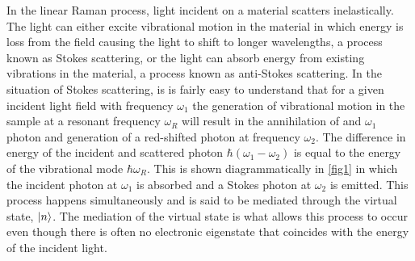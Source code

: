 In the linear Raman process, light incident on a material scatters inelastically. The light can either excite vibrational motion in the material in which energy is loss from the field causing the light to shift to longer wavelengths, a process known as Stokes scattering, or the light can absorb energy from existing vibrations in the material, a process known as anti-Stokes scattering.  In the situation of Stokes scattering, is is fairly easy to understand that for a given incident light field with frequency $\omega_1$ the generation of vibrational motion in the sample at a resonant frequency $\omega_R$ will result in the annihilation of and $\omega_1$ photon and generation of a red-shifted photon at frequency $\omega_2$. The difference in energy of the incident and scattered photon $\hbar(\omega_1-\omega_2)$ is equal to the energy of the vibrational mode $\hbar\omega_R$.  This is shown diagrammatically in \ref{fig1} in which the incident photon at $\omega_1$ is absorbed and a Stokes photon at $\omega_2$ is emitted.  This process happens simultaneously and is said to be mediated through the virtual state, $\lvert n\rangle$.  The mediation of the virtual state is what allows this process to occur even though there is often no electronic eigenstate that coincides with the energy of the incident light.

